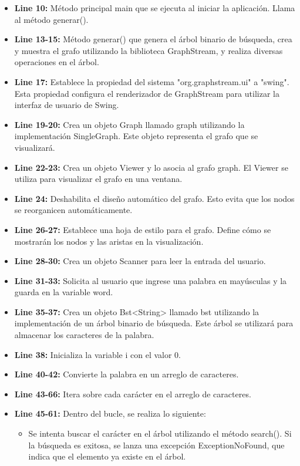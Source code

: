 \documentclass{article}
\begin{document}
\begin{itemize}
\begin{itemize}
\end{itemize}	
	
\begin{itemize}
	\item \textbf{Line 10:} Método principal main que se ejecuta al iniciar la aplicación. Llama al método generar().
	\item \textbf{Line 13-15:} Método generar() que genera el árbol binario de búsqueda, crea y muestra el grafo utilizando la biblioteca GraphStream, y realiza diversas operaciones en el árbol.
	\item \textbf{Line 17:} Establece la propiedad del sistema "org.graphstream.ui" a "swing". Esta propiedad configura el renderizador de GraphStream para utilizar la interfaz de usuario de Swing.
	\item \textbf{Line 19-20:} Crea un objeto Graph llamado graph utilizando la implementación SingleGraph. Este objeto representa el grafo que se visualizará.
	\item \textbf{Line 22-23:} Crea un objeto Viewer y lo asocia al grafo graph. El Viewer se utiliza para visualizar el grafo en una ventana.
	\item \textbf{Line 24:} Deshabilita el diseño automático del grafo. Esto evita que los nodos se reorganicen automáticamente.
	\item \textbf{Line 26-27:} Establece una hoja de estilo para el grafo. Define cómo se mostrarán los nodos y las aristas en la visualización.
	\item \textbf{Line 28-30:} Crea un objeto Scanner para leer la entrada del usuario.
	\item \textbf{Line 31-33:} Solicita al usuario que ingrese una palabra en mayúsculas y la guarda en la variable word.
	\item \textbf{Line 35-37:} Crea un objeto Bst<String> llamado bst utilizando la implementación de un árbol binario de búsqueda. Este árbol se utilizará para almacenar los caracteres de la palabra.
	\item \textbf{Line 38:} Inicializa la variable i con el valor 0.
	\item \textbf{Line 40-42:} Convierte la palabra en un arreglo de caracteres.
	\item \textbf{Line 43-66:} Itera sobre cada carácter en el arreglo de caracteres.
	\item \textbf{Line 45-61:} Dentro del bucle, se realiza lo siguiente:
	\begin{itemize}
	\item Se intenta buscar el carácter en el árbol utilizando el método search(). Si la búsqueda es exitosa, se lanza una excepción ExceptionNoFound, que indica que el elemento ya existe en el árbol.

\end{itemize}
\end{itemize}
\end{itemize}
\end{document}
